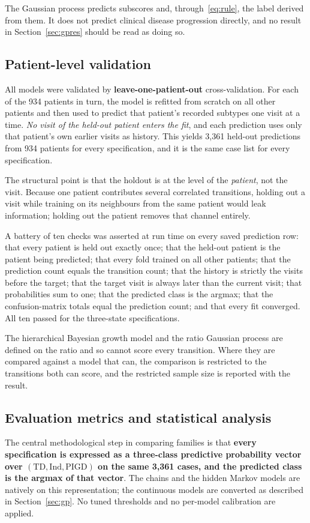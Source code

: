 \documentclass[11pt]{article}
\newcommand{\TD}{\mathrm{TD}}
\newcommand{\PIGD}{\mathrm{PIGD}}
\newcommand{\Ind}{\mathrm{Ind}}
\begin{document}
The Gaussian process predicts subscores and, through~\eqref{eq:rule}, the label
derived from them. It does not predict clinical disease progression directly,
and no result in Section~\ref{sec:gpres} should be read as doing so.

\subsection{Patient-level validation}
\label{sec:validation}
All models were validated by \textbf{leave-one-patient-out} cross-validation.
For each of the 934 patients in turn, the model is refitted from scratch on all
other patients and then used to predict that patient's recorded subtypes one
visit at a time. \emph{No visit of the held-out patient enters the fit}, and
each prediction uses only that patient's own earlier visits as history. This
yields 3,361 held-out predictions from 934 patients for every specification, and
it is the same case list for every specification.

The structural point is that the holdout is at the level of the \emph{patient},
not the visit. Because one patient contributes several correlated transitions,
holding out a visit while training on its neighbours from the same patient would
leak information; holding out the patient removes that channel entirely.

A battery of ten checks was asserted at run time on every saved prediction row:
that every patient is held out exactly once; that the held-out patient is the
patient being predicted; that every fold trained on all other patients; that the
prediction count equals the transition count; that the history is strictly the
visits before the target; that the target visit is always later than the current
visit; that probabilities sum to one; that the predicted class is the argmax;
that the confusion-matrix totals equal the prediction count; and that every fit
converged. All ten passed for the three-state specifications.

The hierarchical Bayesian growth model and the ratio Gaussian process are
defined on the ratio and so cannot score every transition. Where they are
compared against a model that can, the comparison is restricted to the
transitions both can score, and the restricted sample size is reported with the
result.

\subsection{Evaluation metrics and statistical analysis}
\label{sec:stats}
The central methodological step in comparing families is that \textbf{every
specification is expressed as a three-class predictive probability vector over
$(\TD, \Ind, \PIGD)$ on the same 3,361 cases, and the predicted class is the
argmax of that vector}. The chains and the hidden Markov models are natively on
this representation; the continuous models are converted as described in
Section~\ref{sec:gp}. No tuned thresholds and no per-model calibration are
applied.
\end{document}
